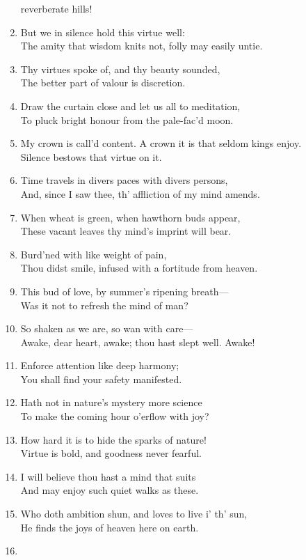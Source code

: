 \documentclass[17pt]{extarticle}
\begin{document}
\begin{enumerate}
  reverberate hills!
\item
  But we in silence hold this virtue well:\\The amity that wisdom knits
  not, folly may easily untie.
\item
  Thy virtues spoke of, and thy beauty sounded,\\The better part of
  valour is discretion.
\item
  Draw the curtain close and let us all to meditation,\\To pluck bright
  honour from the pale-fac'd moon.
\item
  My crown is call'd content. A crown it is that seldom kings
  enjoy.\\Silence bestows that virtue on it.
\item
  Time travels in divers paces with divers persons,\\And, since I saw
  thee, th' affliction of my mind amends.
\item
  When wheat is green, when hawthorn buds appear,\\These vacant leaves
  thy mind's imprint will bear.
\item
  Burd'ned with like weight of pain,\\Thou didst smile, infused with a
  fortitude from heaven.
\item
  This bud of love, by summer's ripening breath---\\Was it not to
  refresh the mind of man?
\item
  So shaken as we are, so wan with care---\\Awake, dear heart, awake;
  thou hast slept well. Awake!
\item
  Enforce attention like deep harmony;\\You shall find your safety
  manifested.
\item
  Hath not in nature's mystery more science\\To make the coming hour
  o'erflow with joy?
\item
  How hard it is to hide the sparks of nature!\\Virtue is bold, and
  goodness never fearful.
\item
  I will believe thou hast a mind that suits\\And may enjoy such quiet
  walks as these.
\item
  Who doth ambition shun, and loves to live i' th' sun,\\He finds the
  joys of heaven here on earth.
\item

\end{enumerate}
\end{document}
